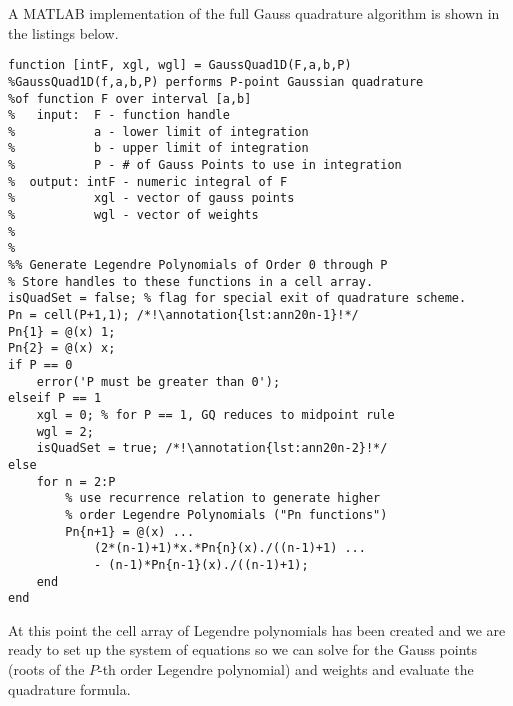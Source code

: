 A MATLAB implementation of the full Gauss quadrature algorithm is shown in the listings below.
\begin{lstlisting}[style=myMatlab,name=lec20n-gp-full]
function [intF, xgl, wgl] = GaussQuad1D(F,a,b,P)
%GaussQuad1D(f,a,b,P) performs P-point Gaussian quadrature 
%of function F over interval [a,b]
%   input:  F - function handle
%           a - lower limit of integration
%           b - upper limit of integration
%           P - # of Gauss Points to use in integration
%  output: intF - numeric integral of F
%           xgl - vector of gauss points
%           wgl - vector of weights
%
%
%% Generate Legendre Polynomials of Order 0 through P
% Store handles to these functions in a cell array.
isQuadSet = false; % flag for special exit of quadrature scheme.
Pn = cell(P+1,1); /*!\annotation{lst:ann20n-1}!*/
Pn{1} = @(x) 1;
Pn{2} = @(x) x;
if P == 0
    error('P must be greater than 0');
elseif P == 1
    xgl = 0; % for P == 1, GQ reduces to midpoint rule 
    wgl = 2;
    isQuadSet = true; /*!\annotation{lst:ann20n-2}!*/
else
    for n = 2:P
        % use recurrence relation to generate higher 
        % order Legendre Polynomials ("Pn functions")
        Pn{n+1} = @(x) ...
            (2*(n-1)+1)*x.*Pn{n}(x)./((n-1)+1) ...
            - (n-1)*Pn{n-1}(x)./((n-1)+1);
    end
end
\end{lstlisting}
At this point the cell array of Legendre polynomials has been created and we are ready to set up the system of equations so we can solve for the Gauss points (roots of the $P$-th order Legendre polynomial) and weights and evaluate the quadrature formula.
